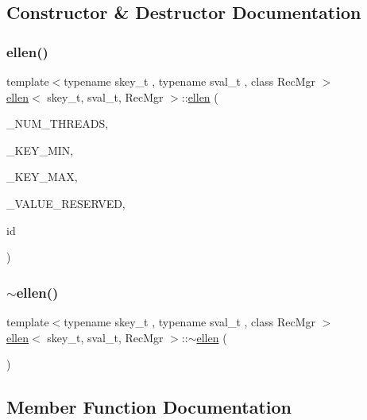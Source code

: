 \subsection{Constructor \& Destructor Documentation}
\mbox{\label{classellen_ad1cfcde41101b3a54020262f0993417a}} 
\subsubsection{\texorpdfstring{ellen()}{ellen()}}
{\footnotesize\ttfamily template$<$typename skey\+\_\+t , typename sval\+\_\+t , class Rec\+Mgr $>$ \\
\hyperlink{classellen}{ellen}$<$ skey\+\_\+t, sval\+\_\+t, Rec\+Mgr $>$\+::\hyperlink{classellen}{ellen} (\begin{DoxyParamCaption}\item[{const int}]{\+\_\+\+N\+U\+M\+\_\+\+T\+H\+R\+E\+A\+DS,  }\item[{const skey\+\_\+t \&}]{\+\_\+\+K\+E\+Y\+\_\+\+M\+IN,  }\item[{const skey\+\_\+t \&}]{\+\_\+\+K\+E\+Y\+\_\+\+M\+AX,  }\item[{const sval\+\_\+t \&}]{\+\_\+\+V\+A\+L\+U\+E\+\_\+\+R\+E\+S\+E\+R\+V\+ED,  }\item[{unsigned int}]{id }\end{DoxyParamCaption})\hspace{0.3cm}{\ttfamily [inline]}}

\mbox{\label{classellen_a466b2bb9d24a652eafb8d38ecfe41a2c}} 
\subsubsection{\texorpdfstring{$\sim$ellen()}{~ellen()}}
{\footnotesize\ttfamily template$<$typename skey\+\_\+t , typename sval\+\_\+t , class Rec\+Mgr $>$ \\
\hyperlink{classellen}{ellen}$<$ skey\+\_\+t, sval\+\_\+t, Rec\+Mgr $>$\+::$\sim$\hyperlink{classellen}{ellen} (\begin{DoxyParamCaption}{ }\end{DoxyParamCaption})\hspace{0.3cm}{\ttfamily [inline]}}



\subsection{Member Function Documentation}
\mbox{\label{classellen_adc627624680a78fd4ad3838ce8ec2b98}} 

